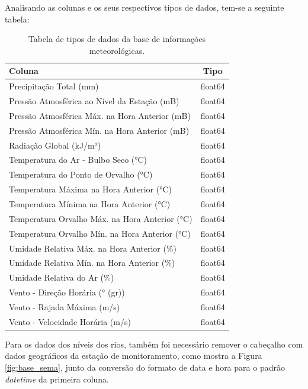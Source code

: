 Analisando as colunas e os seus respectivos tipos de dados, tem-se a seguinte tabela:

\begin{table}[H]
	\centering
	\begin{tabular}{|p{10cm}|c|}
	\hline
	\textbf{Coluna} & \textbf{Tipo} \\
	\hline
	Precipitação Total (mm) & float64 \\
	Pressão Atmosférica ao Nível da Estação (mB) & float64 \\
	Pressão Atmosférica Máx. na Hora Anterior (mB) & float64 \\
	Pressão Atmosférica Mín. na Hora Anterior (mB) & float64 \\
	Radiação Global (kJ/m²) & float64 \\
	Temperatura do Ar - Bulbo Seco (°C) & float64 \\
	Temperatura do Ponto de Orvalho (°C) & float64 \\
	Temperatura Máxima na Hora Anterior (°C) & float64 \\
	Temperatura Mínima na Hora Anterior (°C) & float64 \\
	Temperatura Orvalho Máx. na Hora Anterior (°C) & float64 \\
	Temperatura Orvalho Mín. na Hora Anterior (°C) & float64 \\
	Umidade Relativa Máx. na Hora Anterior (\%) & float64 \\
	Umidade Relativa Mín. na Hora Anterior (\%) & float64 \\
	Umidade Relativa do Ar (\%) & float64 \\
	Vento - Direção Horária (° (gr)) & float64 \\
	Vento - Rajada Máxima (m/s) & float64 \\
	Vento - Velocidade Horária (m/s) & float64 \\
	\hline
	\end{tabular}
	\caption{Tabela de tipos de dados da base de informações meteorológicas.}
	\label{tab:colunas_dados_meteorologicos}
\end{table}

Para os dados dos níveis dos rios, também foi necessário remover o cabeçalho com dados geográficos da estação de monitoramento, como mostra a Figura \ref{fig:base_sema}, junto da conversão do formato de data e hora para o padrão \textit{datetime} da primeira coluna.

